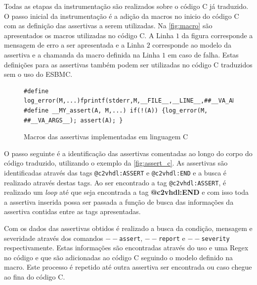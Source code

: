 \par
Todas as etapas da instrumentação são realizados sobre o código C já traduzido. O passo inicial da instrumentação é a adição da macros no inicio do código C com as definição das assertivas a serem utilizadas. Na \autoref{fig:macro} são apresentados os macros utilizadas no código C. A Linha $1$ da figura corresponde a mensagem de erro a ser apresentada e a Linha $2$ corresponde ao modelo da assertiva e a chamanda da macro definida na Linha $1$ em caso de falha. Estas definições para as assertivas também podem ser utilizadas no código C traduzidos sem o uso do ESBMC.

\begin{figure}[H]
\caption{\label{fig:macro} Macros das assertivas implementadas em linguagem C}
	\begin{center}
    \begin{minipage}{0.99\textwidth}
    \begin{lstlisting}       
#define log_error(M,...)fprintf(stderr,M,__FILE__,__LINE__,##__VA_ARGS__)
#define __MY_assert(A, M,...) if(!(A)) {log_error(M, ##__VA_ARGS__); assert(A); }
    \end{lstlisting}
    \end{minipage}
	\end{center}
\end{figure}

\par
O passo seguinte é a identificação das assertivas comentadas ao longo do corpo do código traduzido, utilizando o exemplo da \autoref{fig:assert_c}. As assertivas são identificadas através das tags \texttt{@c2vhdl:ASSERT} e \texttt{@c2vhdl:END} e a busca é realizado através destas tags. Ao ser encontrado a tag \texttt{@c2vhdl:ASSERT}, é realizado um \textit{loop} até que seja encontrada a tag \textbf{@c2vhdl:END} e com isso toda a assertiva inserida possa ser passada a função de busca das informações da assertiva contidas entre as tags apresentadas.

\par
Com os dados das assertivas obtidos é realizado a busca da condição, mensagem e severidade através dos comandos \texttt{$--$assert}, \texttt{$--$report} e \texttt{$--$severity} respectivamente. Estas informações são encontradas através do uso e uma Regex no código e que são adicionadas ao código C seguindo o modelo definido na macro. Este processo é repetido até outra assertiva ser encontrada ou caso chegue ao fina do código C.

